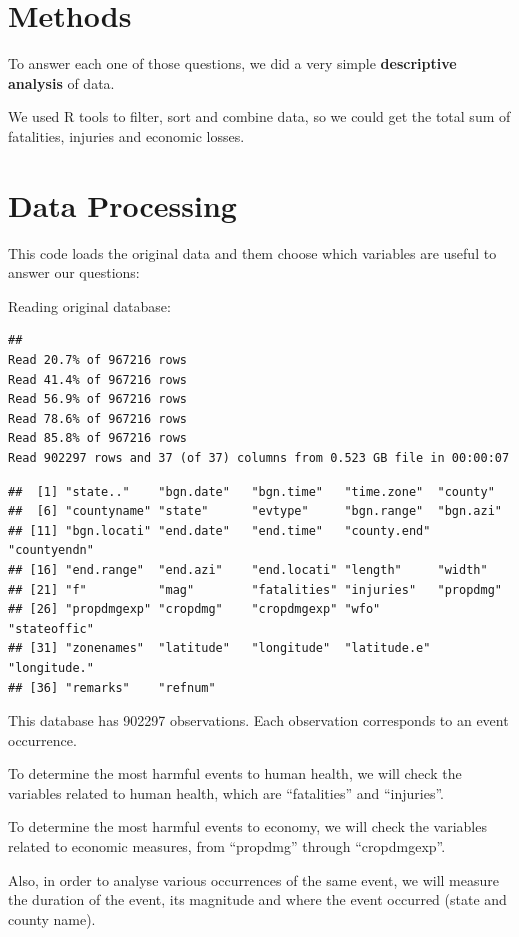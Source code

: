 \documentclass[]{article}
\begin{document}
\section{Methods}\label{methods}

To answer each one of those questions, we did a very simple
\textbf{descriptive analysis} of data.

We used R tools to filter, sort and combine data, so we could get the
total sum of fatalities, injuries and economic losses.

\section{Data Processing}\label{data-processing}

This code loads the original data and them choose which variables are
useful to answer our questions:

Reading original database:

\begin{verbatim}
## 
Read 20.7% of 967216 rows
Read 41.4% of 967216 rows
Read 56.9% of 967216 rows
Read 78.6% of 967216 rows
Read 85.8% of 967216 rows
Read 902297 rows and 37 (of 37) columns from 0.523 GB file in 00:00:07
\end{verbatim}

\begin{verbatim}
##  [1] "state.."    "bgn.date"   "bgn.time"   "time.zone"  "county"    
##  [6] "countyname" "state"      "evtype"     "bgn.range"  "bgn.azi"   
## [11] "bgn.locati" "end.date"   "end.time"   "county.end" "countyendn"
## [16] "end.range"  "end.azi"    "end.locati" "length"     "width"     
## [21] "f"          "mag"        "fatalities" "injuries"   "propdmg"   
## [26] "propdmgexp" "cropdmg"    "cropdmgexp" "wfo"        "stateoffic"
## [31] "zonenames"  "latitude"   "longitude"  "latitude.e" "longitude."
## [36] "remarks"    "refnum"
\end{verbatim}

This database has 902297 observations. Each observation corresponds to
an event occurrence.

To determine the most harmful events to human health, we will check the
variables related to human health, which are ``fatalities'' and
``injuries''.

To determine the most harmful events to economy, we will check the
variables related to economic measures, from ``propdmg'' through
``cropdmgexp''.

Also, in order to analyse various occurrences of the same event, we will
measure the duration of the event, its magnitude and where the event
occurred (state and county name).
\end{document}
